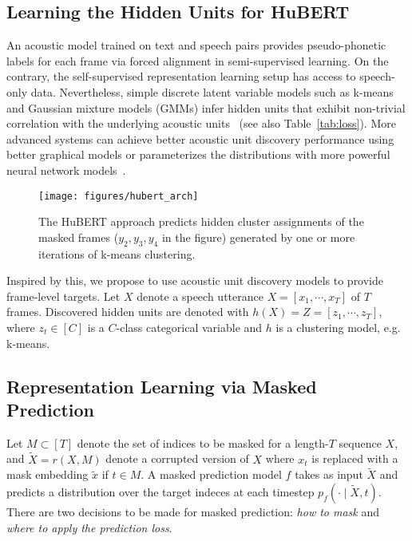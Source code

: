 \subsection{Learning the Hidden Units for HuBERT}
An acoustic model trained on text and speech pairs provides pseudo-phonetic labels for each frame via forced alignment in semi-supervised learning. On the contrary, the self-supervised representation learning setup has access to speech-only data. Nevertheless, simple discrete latent variable models such as k-means and Gaussian mixture models (GMMs) infer hidden units that exhibit non-trivial correlation with the underlying acoustic units~\cite{lee2012nonparametric} (see also Table~\ref{tab:loss}). More advanced systems can achieve better acoustic unit discovery performance using better graphical models \cite{ondel2016variational, ebbers2017hidden} or parameterizes the distributions with more powerful neural network models~\cite{hsu2017learning, hsu2017unsupervised, chorowski2019unsupervised, khurana2019factorial, khurana2020convolutional}.

\begin{figure}[th]
  \centering
  \texttt{[image: figures/hubert\_arch]}\caption{The HuBERT approach predicts hidden cluster assignments of the masked frames ($y_2, y_3, y_4$ in the figure) generated by one or more iterations of k-means clustering.}
  \label{fig:arch}
\end{figure}
Inspired by this, we propose to use acoustic unit discovery models to provide frame-level targets. 
Let $X$ denote a speech utterance $X = [x_1, \cdots, x_T]$ of $T$ frames.
Discovered hidden units are denoted with $h(X) = Z = [z_1, \cdots, z_T]$, where $z_t \in [C]$ is a $C$-class categorical variable and $h$ is a clustering model, e.g. k-means. 

\subsection{Representation Learning via Masked Prediction}\label{sec:maskpred}
Let $M \subset [T]$ denote the set of indices to be masked for a length-$T$ sequence $X$, and $\tilde{X} = r(X, M)$ denote a corrupted version of $X$ where $x_t$ is replaced with a mask embedding $\tilde{x}$ if $t \in M$. A masked prediction model $f$ takes as input $\tilde{X}$ and predicts a distribution over the target indeces at each timestep $p_f(\cdot \mid \tilde{X}, t)$. There are two decisions to be made for masked prediction: \textit{how to mask} and \textit{where to apply the prediction loss}. 

